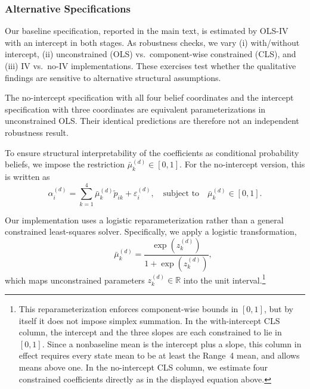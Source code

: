 \documentclass[12pt,reqno]{amsart}
\begin{document}
\subsubsection{Alternative Specifications}
Our baseline specification, reported in the main text, is estimated by OLS-IV with an intercept in both stages. As robustness checks, we vary (i) with/without intercept, (ii) unconstrained (OLS) vs.\ component-wise constrained (CLS), and (iii) IV vs.\ no-IV implementations. These exercises test whether the qualitative findings are sensitive to alternative structural assumptions.

The no-intercept specification with all four belief coordinates and the intercept specification with three coordinates are equivalent parameterizations in unconstrained OLS. Their identical predictions are therefore not an independent robustness result.

 To ensure structural interpretability of the coefficients as conditional probability beliefs,  we impose the restriction $\bar\mu_k^{(d)} \in [0,1]$. For the no-intercept version, this is written as
\[
\]
\[
\alpha_i^{(d)} = \sum_{k=1}^4 \bar\mu_k^{(d)} \tilde p_{ik} + \varepsilon_i^{(d)},
\quad \text{subject to} \quad \bar\mu_k^{(d)} \in [0,1].
\]

 Our implementation uses a logistic reparameterization rather than a general constrained least-squares solver. Specifically, we apply a logistic transformation,
\[
\qquad
\bar\mu_k^{(d)} = \frac{\exp(z_k^{(d)})}{1 + \exp(z_k^{(d)})},
\]
which maps unconstrained parameters  $z_k^{(d)} \in \mathbb{R}$ into the unit interval.\footnote{This reparameterization enforces component-wise bounds in $[0,1]$, but by itself it does not impose simplex summation.  In the with-intercept CLS column, the intercept and the three slopes are each constrained to lie in $[0,1]$. Since a nonbaseline mean is the intercept plus a slope, this column in effect requires every state mean to be at least the Range~4 mean, and allows means above one. In the no-intercept CLS column, we estimate four constrained coefficients directly as in the displayed equation above.}
\end{document}
